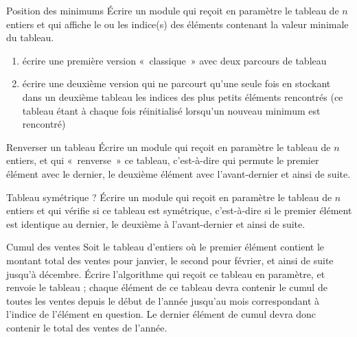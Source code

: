 \begin{Exercice}{Position des minimums}
	Écrire un module qui reçoit en paramètre le tableau
	 de $n$ entiers et qui
	affiche le ou les indice(s) des éléments contenant la valeur minimale
	du tableau.

	\begin{enumerate}[label=\alph*)]
	\item 
		écrire une première version «~classique~» avec deux parcours de tableau
	\item
		écrire une deuxième version qui ne parcourt qu’une seule fois 
		 en
		stockant dans un deuxième tableau les indices des plus petits éléments
		rencontrés (ce tableau étant à chaque fois réinitialisé lorsqu’un
		nouveau minimum est rencontré)
	\end{enumerate}
\end{Exercice}

\begin{Exercice}{Renverser un tableau}
	Écrire un module qui reçoit en paramètre le tableau
	 de $n$ entiers, et qui
	«~renverse~» ce tableau, c’est-à-dire qui permute le premier élément
	avec le dernier, le deuxième élément avec l’avant-dernier et ainsi de
	suite.
\end{Exercice}

\begin{Exercice}{Tableau symétrique ?}
	Écrire un module qui reçoit en paramètre le tableau
	 de $n$ entiers et qui
	vérifie si ce tableau est symétrique, c’est-à-dire si le premier
	élément est identique au dernier, le deuxième à l’avant-dernier et
	ainsi de suite.
\end{Exercice}

\begin{Exercice}{Cumul des ventes}
	Soit le tableau  d’entiers où le
	premier élément contient le montant total des ventes pour janvier, le
	second pour février, et ainsi de suite jusqu'à
	décembre. Écrire l’algorithme qui reçoit ce tableau en paramètre, et
	renvoie le tableau  ; chaque élément
	de ce tableau devra contenir le cumul de toutes les ventes depuis le
	début de l’année jusqu’au mois correspondant à
	l'indice de l’élément en question. Le dernier élément
	de cumul devra donc contenir le total des ventes de l’année.
\end{Exercice}

